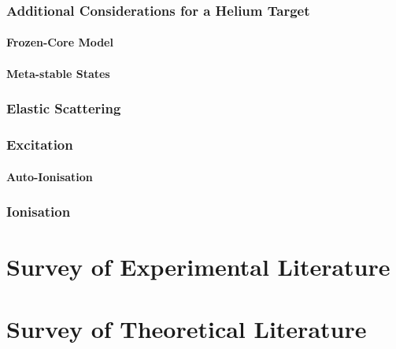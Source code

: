 \documentclass[draft]{article}
\begin{document}
\subsubsection{Additional Considerations for a Helium Target}
\label{sec:he-target}

\paragraph{Frozen-Core Model}
\label{sec:he-frozen-core}

\paragraph{Meta-stable States}
\label{sec:he-meta-stable}


\subsubsection{Elastic Scattering}
\label{sec:e-he-elastic-scattering}

\subsubsection{Excitation}
\label{sec:e-he-excitation}

\paragraph{Auto-Ionisation}
\label{sec:e-he-auto-ionisation}

\subsubsection{Ionisation}
\label{sec:e-he-ionisation}

\section{Survey of Experimental Literature}
\label{sec:survey-experimental}

\section{Survey of Theoretical Literature}
\label{sec:survey-theoretical}
\end{document}
